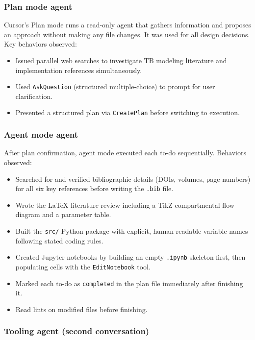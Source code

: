 \documentclass[11pt]{article}
\begin{document}
\subsubsection{Plan mode agent}

Cursor's Plan mode runs a read-only agent that gathers information and proposes an approach without making any file changes. It was used for all design decisions. Key behaviors observed:
\begin{itemize}[noitemsep]
  \item Issued parallel web searches to investigate TB modeling literature and implementation references simultaneously.
  \item Used \texttt{AskQuestion} (structured multiple-choice) to prompt for user clarification.
  \item Presented a structured plan via \texttt{CreatePlan} before switching to execution.
\end{itemize}

\subsubsection{Agent mode agent}

After plan confirmation, agent mode executed each to-do sequentially. Behaviors observed:
\begin{itemize}[noitemsep]
  \item Searched for and verified bibliographic details (DOIs, volumes, page numbers) for all six key references before writing the \texttt{.bib} file.
  \item Wrote the LaTeX literature review including a TikZ compartmental flow diagram and a parameter table.
  \item Built the \texttt{src/} Python package with explicit, human-readable variable names following stated coding rules.
  \item Created Jupyter notebooks by building an empty \texttt{.ipynb} skeleton first, then populating cells with the \texttt{EditNotebook} tool.
  \item Marked each to-do as \texttt{completed} in the plan file immediately after finishing it.
  \item Read lints on modified files before finishing.
\end{itemize}

\subsubsection{Tooling agent (second conversation)}
\end{document}
